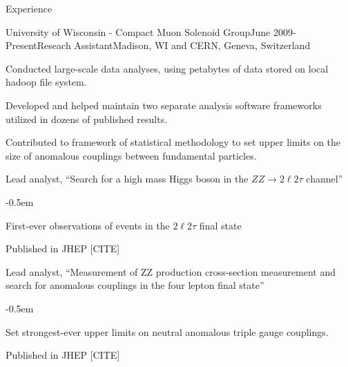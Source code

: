 \documentclass{resume} %
\begin{document}
\begin{rSection}{Experience}


\begin{rSubsection}{University of Wisconsin - Compact Muon Solenoid Group}{June
2009-Present}{Reseach Assistant}{Madison, WI and CERN, Geneva, Switzerland}


\item Conducted large-scale data analyses, using petabytes of data stored on local
    hadoop file system.

\item Developed and helped maintain two separate analysis software
    frameworks utilized in dozens of published results.

\item Contributed to framework of statistical methodology to set upper
    limits on the size of anomalous couplings between fundamental
    particles.

\item Lead analyst, ``Search for a high mass Higgs boson in the
    $ZZ\rightarrow 2\ell2\tau$ channel''
    \begin{list}{}{\leftmargin=1.5em} 
      \itemsep -0.5em \vspace{-0.5em} %
      \item First-ever observations of events in the $2\ell2\tau$ final state
      \item Published in JHEP [CITE]
    \end{list}

\item Lead analyst, ``Measurement of ZZ production cross-section measurement
    and search for anomalous couplings in the four lepton final state'' 
    \begin{list}{}{\leftmargin=1.5em} 
        \itemsep -0.5em \vspace{-0.5em} %
        \item Set strongest-ever upper limits on neutral anomalous triple gauge
            couplings.
        \item Published in JHEP [CITE]
    \end{list}


\end{rSubsection}
\end{rSection}
\end{document}
